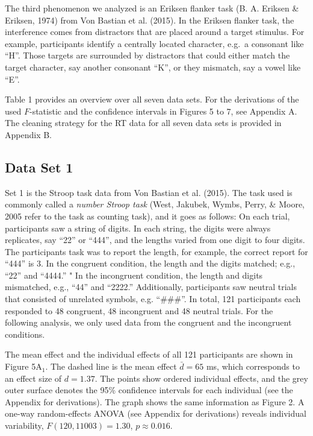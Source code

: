 \documentclass[american,man]{apa6}
\begin{document}
The third phenomenon we analyzed is an Eriksen flanker task (B. A.
Eriksen \& Eriksen, 1974) from Von Bastian et al. (2015). In the Eriksen
flanker task, the interference comes from distractors that are placed
around a target stimulus. For example, participants identify a centrally
located character, e.g.~a consonant like \enquote{H}. Those targets are
surrounded by distractors that could either match the target character,
say another consonant \enquote{K}, or they mismatch, say a vowel like
\enquote{E}.

Table 1 provides an overview over all seven data sets. For the
derivations of the used \(F\)-statistic and the confidence intervals in
Figures 5 to 7, see Appendix A. The cleaning strategy for the RT data
for all seven data sets is provided in Appendix B.

\subsection{Data Set 1}\label{data-set-1}

Set 1 is the Stroop task data from Von Bastian et al. (2015). The task
used is commonly called a \emph{number Stroop task} (West, Jakubek,
Wymbs, Perry, \& Moore, 2005 refer to the task as counting task), and it
goes as follows: On each trial, participants saw a string of digits. In
each string, the digits were always replicates, say \enquote{22} or
\enquote{444}, and the lengths varied from one digit to four digits. The
participants task was to report the length, for example, the correct
report for \enquote{444} is 3. In the congruent condition, the length
and the digits matched; e.g., \enquote{22} and \enquote{4444.} " In the
incongruent condition, the length and digits mismatched, e.g.,
\enquote{44} and \enquote{2222.} Additionally, participants saw neutral
trials that consisted of unrelated symbols, e.g. \enquote{\#\#\#}. In
total, 121 participants each responded to 48 congruent, 48 incongruent
and 48 neutral trials. For the following analysis, we only used data
from the congruent and the incongruent conditions.

The mean effect and the individual effects of all 121 participants are
shown in Figure 5\(\mbox{A}_1\). The dashed line is the mean effect
\(\bar{d} = 65\) ms, which corresponds to an effect size of
\(d = 1.37\). The points show ordered individual effects, and the grey
outer surface denotes the 95\% confidence intervals for each individual
(see the Appendix for derivations). The graph shows the same information
as Figure 2. A one-way random-effects ANOVA (see Appendix for
derivations) reveals individual variability, \(F(120, 11003)= 1.30\),
\(p \approx 0.016\).
\end{document}
